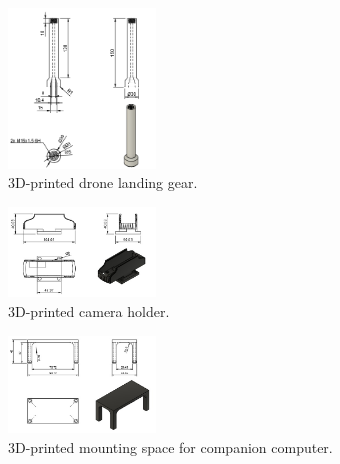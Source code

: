 \begin{figure}[H]
    \centering
    \includegraphics[width=0.35\textwidth]{PLANOS/PLANO_DRONE_PATA.png}
    \caption{3D-printed drone landing gear.}
    \label{fig:landing_gear}
\end{figure}

\begin{figure}[H]
    \centering
    \includegraphics[width=0.35\textwidth]{PLANOS/camera_holder.jpeg}
    \caption{3D-printed camera holder.}
    \label{fig:camera_holder}
\end{figure}

\begin{figure}[H]
    \centering
    \includegraphics[width=0.35\textwidth]{PLANOS/rpi_mount.jpeg}
    \caption{3D-printed mounting space for companion computer.}
    \label{fig:rpi_mount}
\end{figure}

\begin{figure}[H]
    \centering
    \label{fig:drone_cad}
\end{figure}